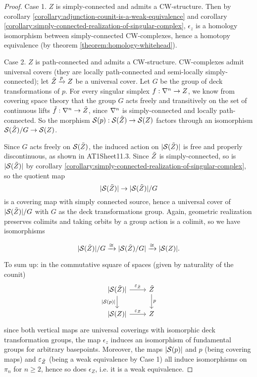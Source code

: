 \begin{proof}
Case 1. $Z$ is simply-connected and admits a CW-structure. Then by corollary \ref{corollary:adjunction-counit-is-a-weak-equivalence} and corollary \ref{corollary:simply-connected-realization-of-singular-complex}, $\epsilon_z$ is a homology isomorphism between simply-connected CW-complexes, hence a homotopy equivalence (by theorem \ref{theorem:homology-whitehead}).

Case 2. $Z$ is path-connected and admits a CW-structure. CW-complexes admit universal covers (they are locally path-connected and semi-locally simply-connected); let $\til Z\xto{p}Z$ be a universal cover. Let $G$ be the group of deck transformations of $p$. For every singular simplex $f:\ns\to Z$, we know from covering space theory that the group $G$ acts freely and transitively on the set of continuous lifts $\til f:\ns\to \til Z$, since $\ns$ is simply-connected and locally path-connected. So the morphism $\S(p):\S(\til Z)\to\S(Z)$ factors through an isomorphism $\S(\til Z)/G\to\S(Z)$.

Since $G$ acts freely on $\S(\til Z)$, the induced action on $|\S(\til Z)|$ is free and properly discontinuous, as shown in AT1Sheet11.3. Since $\til Z$ is simply-connected, so is $|\S(\til Z)|$ by corollary \ref{corollary:simply-connected-realization-of-singular-complex}, so the quotient map
\[|\S(\til Z)|\to|\S(\til Z)|/G\]
is a covering map with simply connected source, hence a universal cover of $|\S(\til Z)|/G$ with $G$ as the deck transformations group. Again, geometric realization preserves colimits and taking orbits by a group action is a colimit, so we have isomorphisms

\[|\S(\til Z)|/G\xto{\cong}|\S(\til Z)/G|\xto{\cong}|\S(Z)|.\]

To sum up: in the commutative square of spaces (given by naturality of the counit)
\[
\begin{tikzcd}
{|\S(\til Z)|} \ar[d,"{|\S(p)|}"'] \ar[r,"\epsilon_{\til Z}"] & \til Z \ar[d,"p"]\\
{|\S(Z)|} \ar[r,"\epsilon_Z"] & Z
\end{tikzcd}
\]
since both vertical maps are universal coverings with isomorphic deck transformation groups, the map $\epsilon_z$ induces an isomorphism of fundamental groups for arbitrary basepoints. Moreover, the maps $|\S(p)|$ and $p$ (being covering maps) and $\epsilon_{\til Z}$ (being a weak equivalence by Case 1) all induce isomorphisms on $\pi_n$ for $n\ge2$, hence so does $\epsilon_Z$, i.e. it is a weak equivalence.


\end{proof}
